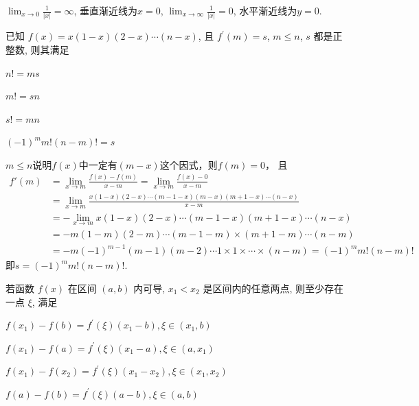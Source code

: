 \documentclass{CWNUExam}
\begin{document}
\begin{analysis}
  $\lim _{x \to 0} \frac{1}{|x|} = \infty$, 垂直渐近线为$x=0$,
  $\lim _{x \to \infty} \frac{1}{|x|} = 0$, 水平渐近线为$y=0$.
\end{analysis}

\begin{problem}
  已知 $f(x)=x(1-x)(2-x) \cdots (n-x)$, 且 $f^{\prime}(m)=s$, $m \leq n$, $s$ 都是正整数, 则其满足
  \paren[D]
  \begin{choices}
    \item $n !=m s$
    \item $m !=s n$
    \item $s !=m n$
    \item $(-1)^{m} m !(n-m) !=s$
  \end{choices}
\end{problem}

\begin{analysis}
  $m \leq n$说明$f(x)$中一定有$(m-x)$这个因式，则$f(m) = 0$， 且
  \begin{align*}
    f'(m) & = \lim_{x \to m} \frac{f(x) - f(m)}{x - m}
    = \lim_{x \to m} \frac{f(x) - 0}{x - m}                                                    \\
          & = \lim_{x \to m} \frac{x(1-x)(2-x) \cdots (m-1-x)(m-x)(m+1-x) \cdots (n-x)}{x - m} \\
          & = - \lim_{x \to m} x(1-x)(2-x) \cdots (m-1-x) (m+1-x) \cdots (n-x)                 \\
          & = - m(1-m)(2-m) \cdots (m-1-m) \times (m+1-m) \cdots (n-m)                         \\
          & = - m (-1)^{m-1}(m-1)(m-2) \cdots 1 \times 1 \times \cdots \times (n-m)
    = (-1)^m m! (n-m)!
  \end{align*}
  即$s = (-1)^m m! (n-m)!$.
\end{analysis}

\begin{problem}
  若函数 $f(x)$ 在区间 $(a, b)$ 内可导, $x_{1}<x_{2}$ 是区间内的任意两点, 则至少存在一点 $\xi$, 满足
  \paren[C]
  \begin{choices}
    \item $f\left(x_{1}\right)-f(b)=f^{\prime}(\xi)\left(x_{1}-b\right), \xi \in\left(x_{1}, b\right)$
    \item $f\left(x_{1}\right)-f(a)=f^{\prime}(\xi)\left(x_{1}-a\right), \xi \in\left(a, x_{1}\right)$
    \item $f\left(x_{1}\right)-f\left(x_{2}\right)=f^{\prime}(\xi)\left(x_{1}-x_{2}\right), \xi \in\left(x_{1}, x_{2}\right)$
    \item $f(a)-f(b)=f^{\prime}(\xi)(a-b), \xi \in(a, b)$
  \end{choices}
\end{problem}
\end{document}
